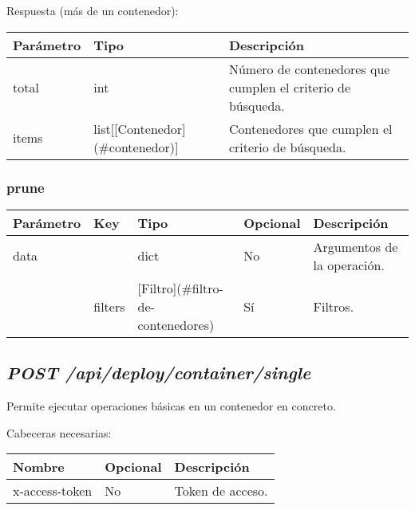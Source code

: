 			Respuesta (más de un contenedor):
			\begin{table}[!h]
				\centering
	\begin{adjustbox}{max width=\textwidth}
				\begin{tabular}{|l|l|l|}
					\hline
					Parámetro & Tipo & Descripción \\ \hline
					total & int & Número de contenedores que cumplen el criterio de búsqueda. \\ \hline
					items & list[[Contenedor](\#contenedor)] & Contenedores que cumplen el criterio de búsqueda. \\ \hline
				\end{tabular}
\end{adjustbox}
			\end{table}
		
		\subsubsection{prune}
			\begin{table}[!h]
				\centering
	\begin{adjustbox}{max width=\textwidth}
				\begin{tabular}{|l|l|l|l|l|}
					\hline
					Parámetro & Key & Tipo & Opcional & Descripción \\ \hline
					data &  & dict & No & Argumentos de la operación. \\ \hline
					& filters & [Filtro](\#filtro-de-contenedores) & Sí & Filtros. \\ \hline
				\end{tabular}
\end{adjustbox}
			\end{table}
	
	
	

	\subsection{\textit{POST /api/deploy/container/single}}
		Permite ejecutar operaciones básicas en un contenedor en concreto.
	
		Cabeceras necesarias:
		\begin{table}[h!]
			\centering
	\begin{adjustbox}{max width=\textwidth}
			\begin{tabular}{|l|l|l|}
				\hline
				Nombre & Opcional & Descripción \\ \hline
				x-access-token & No & Token de acceso. \\ \hline
			\end{tabular}
\end{adjustbox}
		\end{table}
		

